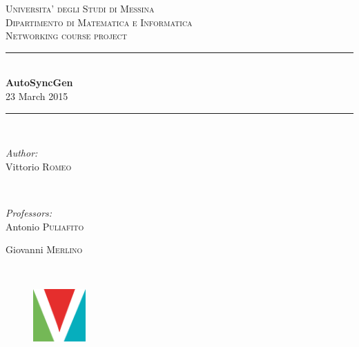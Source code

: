 \documentclass{report}
\newcommand{\HRule}{\rule{\linewidth}{0.5mm}}
\begin{document}
    \begin{titlepage}

        \center

        \textsc{\LARGE Universita' degli Studi di Messina}\\[0.1cm] 
        \textsc{\Large Dipartimento di Matematica e Informatica}\\[0.5cm] 
        \textsc{\Large Networking course project}\\[0.5cm] 

        \HRule \\[0.4cm]
        { \huge \bfseries AutoSyncGen}\\[0.1cm]

        {\large 23 March 2015}
        \HRule \\[1.5cm]
         
        \begin{minipage}{0.4\textwidth}
        \begin{flushleft} \large
        \emph{Author:}\\
        Vittorio \textsc{Romeo} %
        \end{flushleft}
        \end{minipage}
        ~
        \begin{minipage}{0.4\textwidth}
        \begin{flushright} \large
        \emph{Professors:} \\
        Antonio \textsc{Puliafito}

        Giovanni \textsc{Merlino}
        \end{flushright}
        \end{minipage}\\[4cm]

        \vfill

        \begin{minipage}{\linewidth}
            \centering
            \begin{minipage}{0.35\linewidth}
                \begin{figure}[H]
                    \center
                    \includegraphics[width=2cm, height=2cm]{logovee}
                    

\end{figure}
\end{minipage}
\end{minipage}
\end{titlepage}
\end{document}
